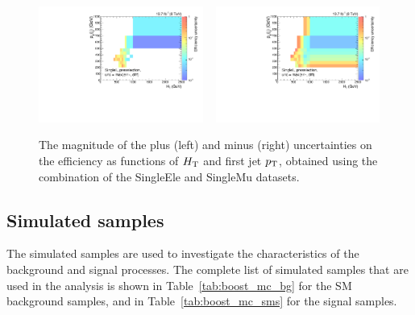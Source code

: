 \begin{figure}[htpb]
\centering
\includegraphics[width=0.48\textwidth]
{figures/razor_trigger/h_HT_j1pt_0_pre_errdiff_up_ph_l_forThesis}
~
\includegraphics[width=0.48\textwidth]
{figures/razor_trigger/h_HT_j1pt_0_pre_errdiff_low_ph_l_forThesis}
\caption{The magnitude of the plus (left) and minus (right) uncertainties on the efficiency as 
functions of $H_{\mathrm{T}}$ and first jet $p_{\mathrm{T}}$, obtained using the combination of the SingleEle and SingleMu 
datasets. 
\label{fig:boost_trigger_efficiency_unc}}
\end{figure}



\subsection{Simulated samples \label{sec:boost_mc_samples}}

The simulated samples are used to investigate the characteristics of the background and signal
processes.  The complete list of simulated samples that are used in the analysis is shown in 
Table~\ref{tab:boost_mc_bg} for the SM background samples, and in Table~\ref{tab:boost_mc_sms} for the 
signal samples. 

